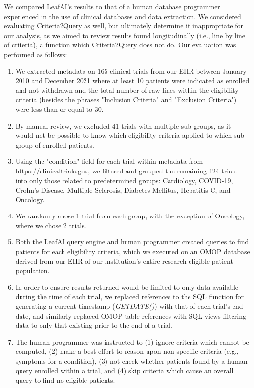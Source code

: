 \documentclass[../main.tex]{subfiles}
\begin{document}
We compared LeafAI's results to that of a human database programmer experienced in the use of clinical databases and data extraction. We considered evaluating Criteria2Query as well, but ultimately determine it inappropriate for our analysis, as we aimed to review results found longitudinally (i.e., line by line of criteria), a function which Criteria2Query does not do. Our evaluation was performed as follows:

\begin{enumerate}
    \item We extracted metadata on 165 clinical trials from our EHR between January 2010 and December 2021 where at least 10 patients were indicated as enrolled and not withdrawn and the total number of raw lines within the eligibility criteria (besides the phrases "Inclusion Criteria" and "Exclusion Criteria") were less than or equal to 30.
    \item By manual review, we excluded 41 trials with multiple sub-groups, as it would not be possible to know which eligibility criteria applied to which sub-group of enrolled patients.
    \item Using the "condition" field for each trial within metadata from \url{https://clinicaltrials.gov}, we filtered and grouped the remaining 124 trials into only those related to predetermined groups: Cardiology, COVID-19, Crohn's Disease, Multiple Sclerosis, Diabetes Mellitus, Hepatitis C, and Oncology. 
    \item We randomly chose 1 trial from each group, with the exception of Oncology, where we chose 2 trials.
    \item Both the LeafAI query engine and human programmer created queries to find patients for each eligibility criteria, which we executed on an OMOP database derived from our EHR of our institution's entire research-eligible patient population. 
    \item In order to ensure results returned would be limited to only data available during the time of each trial, we replaced references to the SQL function for generating a current timestamp (\textit{GETDATE()}) with that of each trial's end date, and similarly replaced OMOP table references with SQL views filtering data to only that existing prior to the end of a trial.
    \item The human programmer was instructed to (1) ignore criteria which cannot be computed, (2) make a best-effort to reason upon non-specific criteria (e.g., symptoms for a condition), (3) not check whether patients found by a human query enrolled within a trial, and (4) skip criteria which cause an overall query to find no eligible patients.
\end{enumerate}
\end{document}

